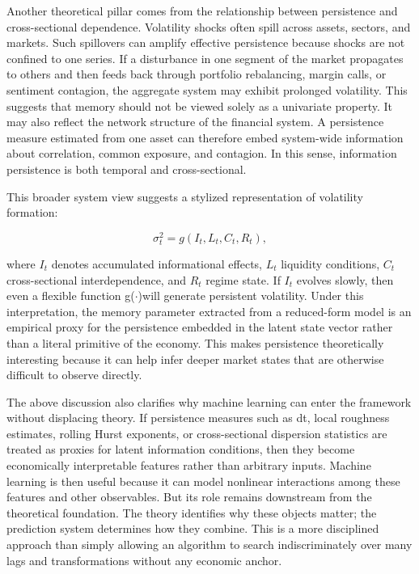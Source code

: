 \documentclass[12pt]{article}
\begin{document}
Another theoretical pillar comes from the relationship between persistence and cross-sectional dependence. Volatility shocks often spill across assets, sectors, and markets. Such spillovers can amplify effective persistence because shocks are not confined to one series. If a disturbance in one segment of the market propagates to others and then feeds back through portfolio rebalancing, margin calls, or sentiment contagion, the aggregate system may exhibit prolonged volatility. This suggests that memory should not be viewed solely as a univariate property. It may also reflect the network structure of the financial system. A persistence measure estimated from one asset can therefore embed system-wide information about correlation, common exposure, and contagion. In this sense, information persistence is both temporal and cross-sectional.

This broader system view suggests a stylized representation of volatility formation:

\[\sigma_t^2 = g(I_t, L_t, C_t, R_t),\]

where $I_t$ denotes accumulated informational effects, $L_t$ liquidity conditions, $C_t$ cross-sectional interdependence, and $R_t$ regime state. If $I_t$ evolves slowly, then even a flexible function g($\cdot$)will generate persistent volatility. Under this interpretation, the memory parameter extracted from a reduced-form model is an empirical proxy for the persistence embedded in the latent state vector rather than a literal primitive of the economy. This makes persistence theoretically interesting because it can help infer deeper market states that are otherwise difficult to observe directly.

The above discussion also clarifies why machine learning can enter the framework without displacing theory. If persistence measures such as dt, local roughness estimates, rolling Hurst exponents, or cross-sectional dispersion statistics are treated as proxies for latent information conditions, then they become economically interpretable features rather than arbitrary inputs. Machine learning is then useful because it can model nonlinear interactions among these features and other observables. But its role remains downstream from the theoretical foundation. The theory identifies why these objects matter; the prediction system determines how they combine. This is a more disciplined approach than simply allowing an algorithm to search indiscriminately over many lags and transformations without any economic anchor.
\end{document}
